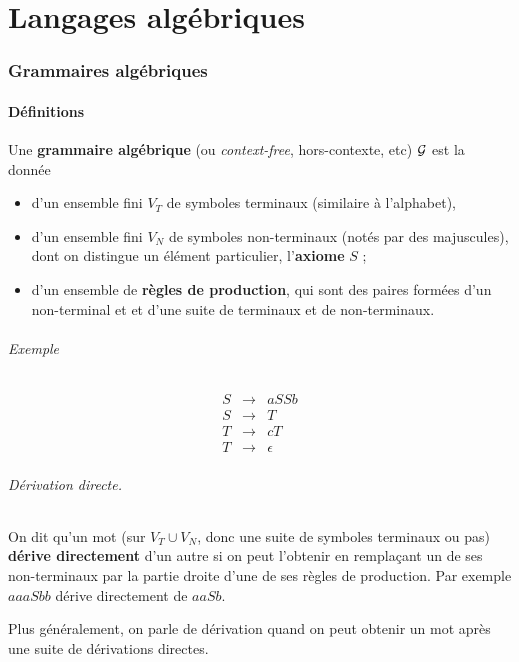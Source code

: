 \documentclass[10pt,twoside]{article}
\begin{document}
\clearpage
\part{Langages algébriques}

\section{Grammaires algébriques}

\subsection{Définitions}

Une \textbf{grammaire algébrique} (ou \emph{context-free}, hors-contexte, etc)
 $\cal G$ est la donnée
\begin{itemize}
    \item d'un ensemble fini  $V_T$ 
    de symboles terminaux (similaire à l'alphabet),
    \item d'un ensemble fini $V_N$ de symboles non-terminaux (notés par
    des majuscules), dont on
    distingue un élément particulier, l'\textbf{axiome} $S$ ;
    \item d'un ensemble de \textbf{règles de production}, 
    qui sont des paires formées d'un non-terminal et
    et d'une suite de terminaux et de non-terminaux.
\end{itemize}


\paragraph{Exemple}
$$\begin{array}{lcl}
   S &\rightarrow& aSSb \\
   S &\rightarrow& T   \\
   T &\rightarrow& cT   \\
   T &\rightarrow& \epsilon 
   \end{array}
   $$


\paragraph{Dérivation directe.} On dit qu'un mot (sur $V_T \cup V_N$, 
donc une suite de symboles terminaux ou pas) 
\textbf{dérive directement} d'un autre si on peut l'obtenir en
remplaçant un de ses non-terminaux par la partie droite d'une de ses
règles de production. Par exemple $ aaaSbb $ dérive directement
de $ aaSb $.

Plus généralement, on parle de dérivation quand on peut obtenir un mot
après une suite de dérivations directes.
\end{document}
